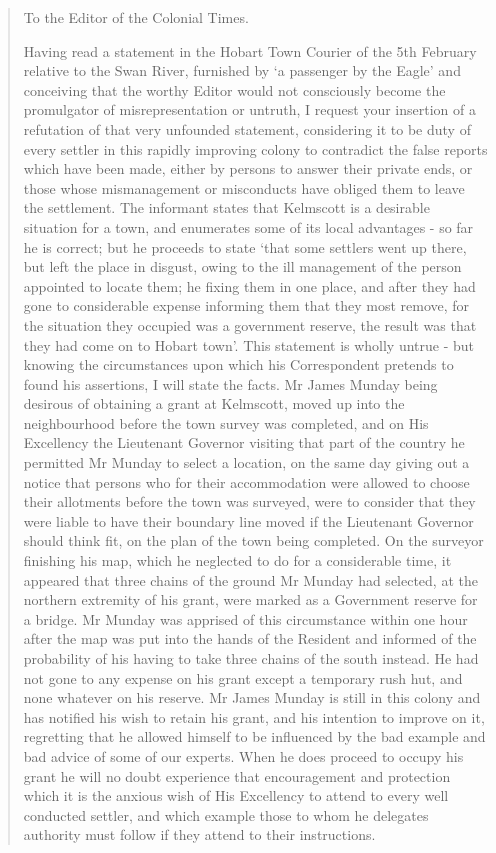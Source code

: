 \begin{quotation}
To the Editor of the Colonial Times.

Having read a statement in the Hobart Town Courier of the 5th February relative to the Swan River, furnished by `a passenger by the Eagle' and conceiving that the worthy Editor would not consciously become the promulgator of misrepresentation or untruth, I request your insertion of a refutation of that very unfounded statement, considering it to be duty of every settler in this rapidly improving colony to contradict the false reports which have been made, either by persons to answer their private ends, or those whose mismanagement or misconducts have obliged them to leave the settlement. The informant states that Kelmscott is a desirable situation for a town, and enumerates some of its local advantages - so far he is correct; but he proceeds to state `that some settlers went up there, but left the place in disgust, owing to the ill management of the person appointed to locate them; he fixing them in one place, and after they had gone to considerable expense informing them that they most remove, for the situation they occupied was a government reserve, the result was that they had come on to Hobart town'. This statement is wholly untrue - but knowing the circumstances upon which his Correspondent pretends to found his assertions, I will state the facts. Mr James Munday being desirous of obtaining a grant at Kelmscott, moved up into the neighbourhood before the town survey was completed, and on His Excellency the Lieutenant Governor visiting that part of the country he permitted Mr Munday to select a location, on the same day giving out a notice that persons who for their accommodation were allowed to choose their allotments before the town was surveyed, were to consider that they were liable to have their boundary line moved if the Lieutenant Governor should think fit, on the plan of the town being completed. On the surveyor finishing his map, which he neglected to do for a considerable time, it appeared that three chains of the ground Mr Munday had selected, at the northern extremity of his grant, were marked as a Government reserve for a bridge. Mr Munday was apprised of this circumstance within one hour after the map was put into the hands of the Resident and informed of the probability of his having to take three chains of the south instead. He had not gone to any expense on his grant except a temporary rush hut, and none whatever on his reserve. Mr James Munday is still in this colony and has notified his wish to retain his grant, and his intention to improve on it, regretting that he allowed himself to be influenced by the bad example and bad advice of some of our experts. When he does proceed to occupy his grant he will no doubt experience that encouragement and protection which it is the anxious wish of His Excellency to attend to every well conducted settler, and which example those to whom he delegates authority must follow if they attend to their instructions.


\end{quotation}
